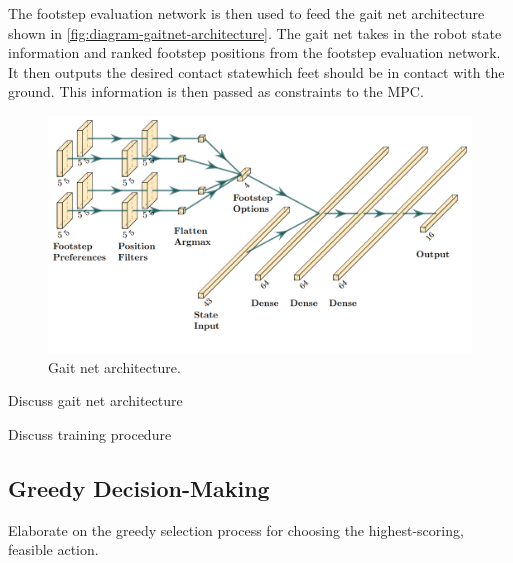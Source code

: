 The footstep evaluation network is then used to feed the gait net architecture shown in \autoref{fig:diagram-gaitnet-architecture}. The gait net takes in the robot state information and ranked footstep positions from the footstep evaluation network. It then outputs the desired contact state\textemdash which feet should be in contact with the ground. This information is then passed as constraints to the MPC.

\begin{figure}
  \centering
  \includegraphics[width=0.5\linewidth]{images/diagrams/gaitnet-architecture.png}
  \caption{Gait net architecture.}
  \label{fig:diagram-gaitnet-architecture}
\end{figure}

\begin{todo}
  Discuss gait net architecture
\end{todo}

\begin{todo}
  Discuss training procedure
\end{todo}

\subsection{Greedy Decision-Making}

\begin{outline}
  Elaborate on the greedy selection process for choosing the highest-scoring, feasible action.
\end{outline}
